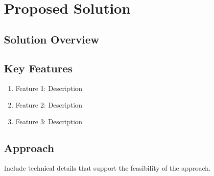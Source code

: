 \section{Proposed Solution}

\subsection{Solution Overview}


\subsection{Key Features}

\begin{enumerate}
    \item Feature 1: Description
    \item Feature 2: Description
    \item Feature 3: Description
\end{enumerate}

\subsection{Approach}


\begin{technicaldetail}
Include technical details that support the feasibility of the approach.
\end{technicaldetail}
